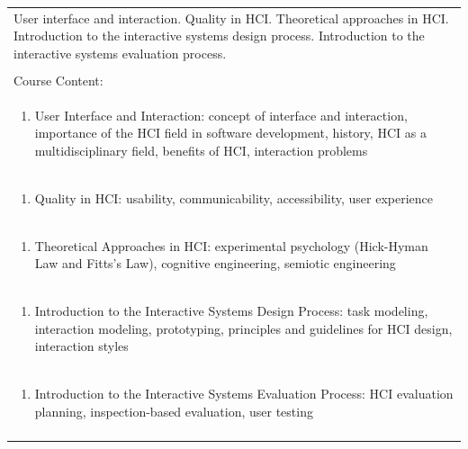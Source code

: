 \documentclass[11pt]{article}
\begin{document}
\begin{center}
\begin{longtable}{|p{4cm}|p{4cm}|p{4cm}|p{4cm}|}
\multicolumn{4}{|p{\dimexpr 16cm + 6\tabcolsep\relax}|}{User interface and interaction. Quality in HCI. Theoretical approaches in HCI. Introduction to the interactive systems design process. Introduction to the interactive systems evaluation process.}\\
\multicolumn{4}{|p{16cm}|}{}\\
\hline
\multicolumn{4}{|p{16cm}|}{Course Content:}\\*
\multicolumn{4}{|p{\dimexpr 16cm + 6\tabcolsep\relax}|}{\begin{enumerate}[start=1]\item User Interface and Interaction: concept of interface and interaction, importance of the HCI field in software development, history, HCI as a multidisciplinary field, benefits of HCI, interaction problems\end{enumerate}}\\
\multicolumn{4}{|p{\dimexpr 16cm + 6\tabcolsep\relax}|}{\begin{enumerate}[start=2]\item Quality in HCI: usability, communicability, accessibility, user experience\end{enumerate}}\\
\multicolumn{4}{|p{\dimexpr 16cm + 6\tabcolsep\relax}|}{\begin{enumerate}[start=3]\item Theoretical Approaches in HCI: experimental psychology (Hick-Hyman Law and Fitts's Law), cognitive engineering, semiotic engineering\end{enumerate}}\\
\multicolumn{4}{|p{\dimexpr 16cm + 6\tabcolsep\relax}|}{\begin{enumerate}[start=4]\item Introduction to the Interactive Systems Design Process: task modeling, interaction modeling, prototyping, principles and guidelines for HCI design, interaction styles\end{enumerate}}\\
\multicolumn{4}{|p{\dimexpr 16cm + 6\tabcolsep\relax}|}{\begin{enumerate}[start=5]\item Introduction to the Interactive Systems Evaluation Process: HCI evaluation planning, inspection-based evaluation, user testing\end{enumerate}}\\
\multicolumn{4}{|p{\dimexpr 16cm + 6\tabcolsep\relax}|}{}\\
\hline

\end{longtable}
\end{center}
\end{document}
